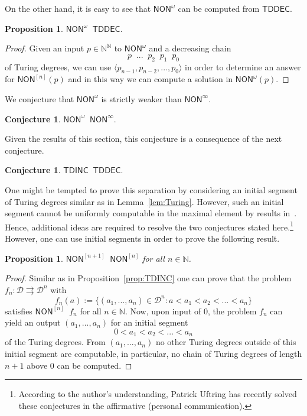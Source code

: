 \documentclass[11pt,a4paper]{amsart}
\theoremstyle{plain}
\newtheorem{prop}[thm]{Proposition}
\theoremstyle{definition}
\newtheorem{conj}[thm]{Conjecture}
\theoremstyle{defC}
\theoremstyle{thmC}
\theoremstyle{plain}
\numberwithin{equation}{section}
\def\TDINC{\mathsf{TDINC}}
\def\TDDEC{\mathsf{TDDEC}}
\def\NON{\mathsf{NON}}
\def\DD{{\mathcal D}}
\def\IN{{\mathbb{N}}}
\def\mto{\rightrightarrows}
\def\lT{\mathop{<_{\mathrm{T}}}}
\def\leqW{\mathop{\leq_{\mathrm{W}}}}
\def\equivW{\mathop{\equiv_{\mathrm{W}}}}
\def\nleqW{\mathop{\not\leq_{\mathrm{W}}}}
\def\lW{\mathop{<_{\mathrm{W}}}}
\def\leqW{\mathop{\leq_{\mathrm{W}}}}
\def\equivW{\mathop{\equiv_{\mathrm{W}}}}
\def\nleqW{\mathop{\not\leq_{\mathrm{W}}}}
\def\lW{\mathop{<_{\mathrm{W}}}}
\begin{document}
\noindent
On the other hand, it is easy to see that $\NON^\omega$ can be computed from $\TDDEC$.

\begin{prop}
$\NON^\omega\leqW\TDDEC$.
\end{prop}
\begin{proof}
Given an input $p\in\IN^\IN$ to $\NON^\omega$ and a decreasing chain 
\[p\lT ...\lT p_2\lT p_1\lT p_0\]
of Turing degrees,
we can use $\langle p_{n-1},p_{n-2},...,p_0\rangle$ in order to determine an answer for $\NON^{[n]}(p)$ and in this way we can
compute a solution in $\NON^\omega(p)$.
\end{proof}

\noindent
We conjecture that $\NON^\omega$ is strictly weaker than $\NON^\infty$.

\begin{conj}
\label{conjecture:NON-omega}
$\NON^\omega\lW\NON^\infty$.
\end{conj}

\noindent
Given the results of this section, this conjecture is a consequence of the next
conjecture.

\begin{conj}
$\TDINC\nleqW\TDDEC$.
\end{conj}

\noindent
One might be tempted to prove this separation by considering an initial segment of Turing
degrees similar as in Lemma~\ref{lem:Turing}. However, such an initial segment cannot
be uniformly computable in the maximal element by results in~\cite{Ish02}.
Hence, additional ideas are required to resolve the two conjectures stated here.\footnote{According to the author's understanding, Patrick Uftring has recently solved these conjectures in the affirmative (personal communication).}
However, one can use initial segments in order to prove the following result.

\begin{prop}
$\NON^{[n+1]}\nleqW\NON^{[n]}$ for all $n\in\IN$.
\end{prop}
\begin{proof}
Similar as in Proposition~\ref{prop:TDINC} one can prove that the problem $f_n:\DD\mto\DD^n$ with
\[f_n(a):=\{(a_1,...,a_n)\in\DD^n:a<a_1<a_2<...<a_n\}\]
satisfies $\NON^{[n]}\equivW f_n$ for all $n\in\IN$.
Now, upon input of $0$, the problem $f_n$ can yield an output $(a_1,...,a_n)$
for an initial segment
\[0<a_1<a_2<...<a_n\]
of the Turing degrees. From $(a_1,...,a_n)$ no other Turing degrees outside of this
initial segment are computable, in particular, no chain of Turing degrees of length $n+1$
above $0$ can be computed.
\end{proof}
\end{document}
